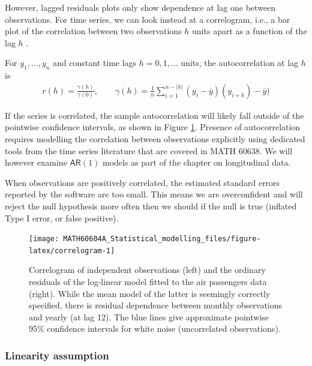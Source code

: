 \documentclass[
  11pt,
  letterpaper,
]{book}
\theoremstyle{definition}
\theoremstyle{definition}
\theoremstyle{definition}
\theoremstyle{remark}
\begin{document}
However, lagged residuals plots only show dependence at lag one between observations. For time series, we can look instead at a correlogram, i.e., a bar plot of the correlation between two observations \(h\) units apart as a function of the lag \(h\) \citep[Definition 1.4.4]{Brockwell/Davis:2016}.

For \(y_1, \ldots, y_n\) and constant time lags \(h=0, 1, \ldots\) units, the autocorrelation at lag \(h\) is
\begin{align*}
r(h) = \frac{\gamma(h)}{\gamma(0)}, \qquad \gamma(h) = \frac{1}{n}\sum_{i=1}^{n-|h|} (y_i-\overline{y})(y_{i+h}) - \overline{y}) 
\end{align*}

If the series is correlated, the sample autocorrelation will likely fall outside of the pointwise confidence intervals, as shown in Figure \ref{fig:correlogram}. Presence of autocorrelation requires modelling the correlation between observations explicitly using dedicated tools from the time series literature that are covered in MATH 60638. We will however examine \(\mathsf{AR}(1)\) models as part of the chapter on longitudinal data.

When observations are positively correlated, the estimated standard errors reported by the software are too small. This means we are overconfident and will reject the null hypothesis more often then we should if the null is true (inflated Type I error, or false positive).

\begin{figure}

{\centering \texttt{[image: MATH60604A\_Statistical\_modelling\_files/figure-latex/correlogram-1]} 

}

\caption{Correlogram of independent observations (left) and the ordinary residuals of the log-linear model fitted to the air passengers data (right). While the mean model of the latter is seemingly correctly specified, there is residual dependence between monthly observations and yearly (at lag 12). The blue lines give approximate pointwise 95\% confidence intervals for white noise (uncorrelated observations).}\label{fig:correlogram}
\end{figure}

\hypertarget{linearity-assumption}{%
\subsubsection{Linearity assumption}\label{linearity-assumption}}
\end{document}
